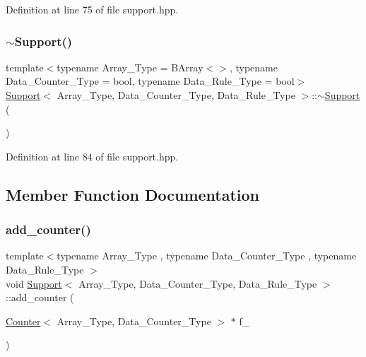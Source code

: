 Definition at line 75 of file support.\+hpp.

\mbox{\label{class_support_a9c5f33ac43d962272b616948dec5d825}} 
\subsubsection{\texorpdfstring{$\sim$\+Support()}{~Support()}}
{\footnotesize\ttfamily template$<$typename Array\+\_\+\+Type = B\+Array$<$$>$, typename Data\+\_\+\+Counter\+\_\+\+Type = bool, typename Data\+\_\+\+Rule\+\_\+\+Type = bool$>$ \\
\hyperlink{class_support}{Support}$<$ Array\+\_\+\+Type, Data\+\_\+\+Counter\+\_\+\+Type, Data\+\_\+\+Rule\+\_\+\+Type $>$\+::$\sim$\hyperlink{class_support}{Support} (\begin{DoxyParamCaption}{ }\end{DoxyParamCaption})\hspace{0.3cm}{\ttfamily [inline]}}



Definition at line 84 of file support.\+hpp.



\subsection{Member Function Documentation}
\mbox{\label{class_support_a364df2c6295341f2801ebe0419d1d97c}} 
\subsubsection{\texorpdfstring{add\+\_\+counter()}{add\_counter()}\hspace{0.1cm}{\footnotesize\ttfamily [1/2]}}
{\footnotesize\ttfamily template$<$typename Array\+\_\+\+Type , typename Data\+\_\+\+Counter\+\_\+\+Type , typename Data\+\_\+\+Rule\+\_\+\+Type $>$ \\
void \hyperlink{class_support}{Support}$<$ Array\+\_\+\+Type, Data\+\_\+\+Counter\+\_\+\+Type, Data\+\_\+\+Rule\+\_\+\+Type $>$\+::add\+\_\+counter (\begin{DoxyParamCaption}\item[{\hyperlink{class_counter}{Counter}$<$ Array\+\_\+\+Type, Data\+\_\+\+Counter\+\_\+\+Type $>$ $\ast$}]{f\+\_\+ }\end{DoxyParamCaption})\hspace{0.3cm}{\ttfamily [inline]}}



